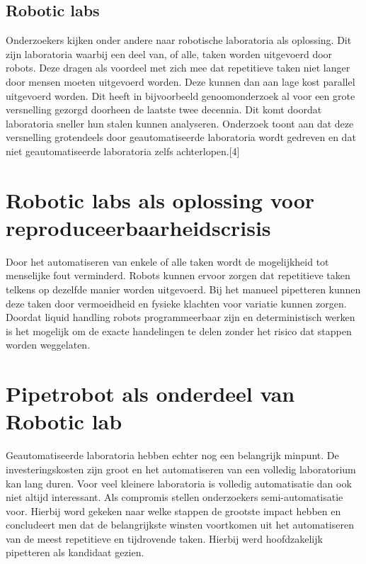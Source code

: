\subsection{Robotic labs}
Onderzoekers kijken onder andere naar robotische laboratoria als oplossing. Dit zijn laboratoria waarbij een deel van, of alle, taken worden uitgevoerd door robots. Deze dragen als voordeel met zich mee dat repetitieve taken niet langer door mensen moeten uitgevoerd worden. Deze kunnen dan aan lage kost parallel uitgevoerd worden. Dit heeft in bijvoorbeeld genoomonderzoek al voor een grote versnelling gezorgd doorheen de laatste twee decennia. Dit komt doordat laboratoria sneller hun stalen kunnen analyseren. Onderzoek toont aan dat deze versnelling grotendeels door geautomatiseerde laboratoria wordt gedreven en dat niet geautomatiseerde laboratoria zelfs achterlopen.[4]

\section{Robotic labs als oplossing voor reproduceerbaarheidscrisis}
Door het automatiseren van enkele of alle taken wordt de mogelijkheid tot menselijke fout verminderd. Robots kunnen ervoor zorgen dat repetitieve taken telkens op dezelfde manier worden uitgevoerd. Bij het manueel pipetteren kunnen deze taken door vermoeidheid en fysieke klachten voor variatie kunnen zorgen.\ \cite{RN9} Doordat liquid handling robots programmeerbaar zijn en deterministisch werken is het mogelijk om de exacte handelingen te delen zonder het risico dat stappen worden weggelaten.

\section{Pipetrobot als onderdeel van Robotic lab}
Geautomatiseerde laboratoria hebben echter nog een belangrijk minpunt. De investeringskosten zijn groot en het automatiseren van een volledig laboratorium kan lang duren. 
Voor veel kleinere laboratoria is volledig automatisatie dan ook niet altijd interessant. Als compromis stellen onderzoekers semi-automatisatie voor. Hierbij word gekeken naar welke stappen de grootste impact hebben en concludeert men dat de belangrijkste winsten voortkomen uit het automatiseren van de meest repetitieve en tijdrovende taken. Hierbij werd hoofdzakelijk pipetteren als kandidaat gezien.\citet{RN11,RN7}


